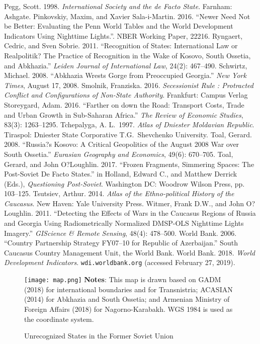 \documentclass[12pt,a4paper]{article}%
\begin{document}
\begin{thebibliography}{99}
\bibitem{} Pegg, Scott. 1998. \textit{International Society and the de Facto State}. Farnham: Ashgate.
\bibitem{} Pinkovskiy, Maxim, and Xavier Sala-i-Martin. 2016. ``Newer Need Not be Better: Evaluating the Penn World Tables and the World Development Indicators Using Nighttime Lights.''. NBER Working Paper, 22216.
\bibitem{} Ryngaert, Cedric, and Sven Sobrie. 2011. ``Recognition of States: International Law or Realpolitik? The Practice of Recognition in the Wake of Kosovo, South Ossetia, and Abkhazia.'' \textit{Leiden Journal of International Law}, 24(2): 467--490.
\bibitem{} Schwirtz, Michael. 2008. ``Abkhazia Wrests Gorge from Preoccupied Georgia.'' \textit{New York Times}, August 17, 2008.
\bibitem{} Smolnik, Franziska. 2016. \textit{Secessionist Rule : Protracted Conflict and Configurations of Non-State Authority}. Frankfurt: Campus Verlag
\bibitem{} Storeygard, Adam. 2016. ``Farther on down the Road: Transport Costs, Trade and Urban Growth in Sub-Saharan Africa.'' \textit{The Review of Economic Studies}, 83(3): 1263--1295.
\bibitem{} Tchepalyga, A. L.\ 1997. \textit{Atlas of Dniester Moldavian Republic}. Tiraspol: Dniester State Corporative T.G.\ Shevchenko University.
\bibitem{} Toal, Gerard. 2008. ``Russia?s Kosovo: A Critical Geopolitics of the August 2008 War over South Ossetia.'' \textit{Eurasian Geography and Economics}, 49(6): 670--705.
\bibitem{} Toal, Gerard, and John O?Loughlin. 2017. ``Frozen Fragments, Simmering Spaces: The Post-Soviet De Facto States.'' in Holland, Edward C., and Matthew Derrick (Eds.), \textit{Questioning Post-Soviet}. Washington DC: Woodrow Wilson Press, pp. 103--125.
\bibitem{} Tsutsiev, Arthur. 2014. \textit{Atlas of the Ethno-political History of the Caucasus}. New Haven: Yale University Press.
\bibitem{} Witmer, Frank D.W., and John O?Loughlin. 2011. ``Detecting the Effects of Wars in the Caucasus Regions of Russia and Georgia Using Radiometrically Normalized DMSP-OLS Nighttime Lights Imagery.'' \textit{GIScience \& Remote Sensing}, 48(4): 478--500.
\bibitem{} World Bank. 2006. ``Country Partnership Strategy FY07--10 for Republic of Azerbaijan.'' South Caucasus Country Management Unit, the World Bank.
\bibitem{} World Bank. 2018. \textit{World Development Indicators}. \verb!wdi.worldbank.org! (accessed February 27, 2019).
\end{thebibliography}

\clearpage

\begin{figure}[ptb]
\caption{Unrecognized States in the Former Soviet Union}
\texttt{[image: map.png]}
\label{map}%
{\scriptsize \textbf{Notes}: 
	This map is drawn based on GADM (2018) for international boundaries and for Transnistria; ACASIAN (2014) for Abkhazia and South Ossetia; and Armenian Ministry of Foreign Affairs (2018) for Nagorno-Karabakh. WGS 1984 is used as the coordinate system.
}
\end{figure}
\end{document}
